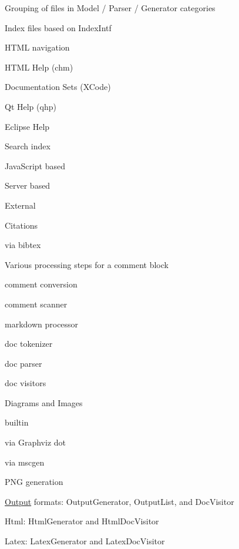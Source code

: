 \begin{DoxyItemize}
\item Grouping of files in Model / Parser / Generator categories
\item Index files based on Index\-Intf
\begin{DoxyItemize}
\item H\-T\-M\-L navigation
\item H\-T\-M\-L Help (chm)
\item Documentation Sets (X\-Code)
\item Qt Help (qhp)
\item Eclipse Help
\end{DoxyItemize}
\item Search index
\begin{DoxyItemize}
\item Java\-Script based
\item Server based
\item External
\end{DoxyItemize}
\item Citations
\begin{DoxyItemize}
\item via bibtex
\end{DoxyItemize}
\item Various processing steps for a comment block
\begin{DoxyItemize}
\item comment conversion
\item comment scanner
\item markdown processor
\item doc tokenizer
\item doc parser
\item doc visitors
\end{DoxyItemize}
\item Diagrams and Images
\begin{DoxyItemize}
\item builtin
\item via Graphviz dot
\item via mscgen
\item P\-N\-G generation
\end{DoxyItemize}
\item \hyperlink{structOutput}{Output} formats\-: Output\-Generator, Output\-List, and Doc\-Visitor
\begin{DoxyItemize}
\item Html\-: Html\-Generator and Html\-Doc\-Visitor
\item Latex\-: Latex\-Generator and Latex\-Doc\-Visitor

\end{DoxyItemize}
\end{DoxyItemize}
